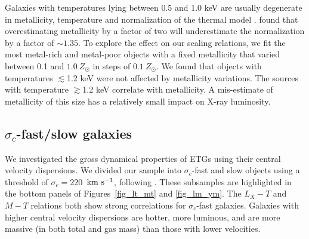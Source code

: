 \documentclass[iop]{emulateapj}
\begin{document}

Galaxies with temperatures lying between 0.5 and 1.0 keV are usually degenerate in metallicity, temperature and normalization of the thermal model \citep{Werner:12}. \citet{Werner:12} found that overestimating metallicity by a factor of two will underestimate the normalization by a factor of $\sim1.35$. To explore the effect on our scaling relations, we fit the most metal-rich and metal-poor objects with a fixed metallicity that varied between 0.1 and $1.0~Z_{\odot}$ in steps of $0.1~Z_{\odot}$. We found that objects with temperatures $\lesssim$1.2 keV were not affected by metallicity variations. The sources with temperature $\gtrsim$1.2 keV correlate with metallicity. 
A mis-estimate of metallicity of this size has a relatively small impact on X-ray luminosity. 


\subsection{$\sigma_c$-fast/slow galaxies}
We investigated the gross dynamical properties of ETGs using their central velocity dispersions. We divided our sample into $\sigma_c$-fast and slow objects using a threshold of $\sigma_c = 220$~$\rm km~s^{-1}$, following \citet{Kim:15}. These subsamples are highlighted in the bottom panels of Figures~\ref{fig_lt_mt} and \ref{fig_lm_ym}. The $L_X-T$ and $M-T$ relations both show strong correlations for $\sigma_c$-fast galaxies.  Galaxies with higher central velocity dispersions are hotter, more luminous, and are more massive (in both total and gas mass) than those with lower velocities.
\end{document}
